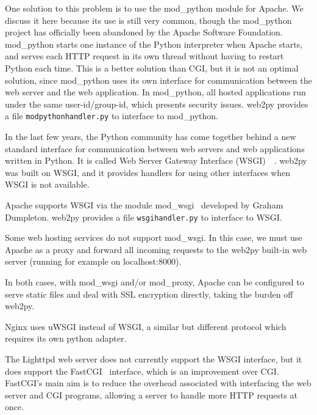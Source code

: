 \documentclass[justified,sixbynine,notoc]{tufte-book}
\def\ft{\small\tt}
\begin{document}
\begin{fullwidth}
One solution to this problem is to use the mod\_python module for Apache. We discuss it here because its use is still very common, though the mod\_python project has officially been abandoned by the Apache Software Foundation. mod\_python starts one instance of the Python interpreter when Apache starts, and serves each HTTP request in its own thread without having to restart Python each time. This is a better solution than CGI, but it is not an optimal solution, since mod\_python uses its own interface for communication between the web server and the web application. In mod\_python, all hosted applications run under the same user-id/group-id, which presents security issues.
\noindent web2py provides a file {\ft modpythonhandler.py} to interface to mod\_python.

In the last few years, the Python community has come together behind a new standard interface for communication between web servers and web applications written in Python. It is called Web Server Gateway Interface (WSGI)~\cite{wsgi-w}~\cite{wsgi-o}. web2py was built on WSGI, and it provides handlers for using other interfaces when WSGI is not available.

Apache supports WSGI via the module mod\_wsgi~\cite{modwsgi}  developed by Graham Dumpleton.
\noindent web2py provides a file {\ft wsgihandler.py} to interface to WSGI.

Some web hosting services do not support mod\_wsgi. In this case, we must use Apache as a proxy and forward all incoming requests to the web2py built-in web server (running for example on localhost:8000).

In both cases, with mod\_wsgi and/or mod\_proxy, Apache can be configured to serve static files and deal with SSL encryption directly, taking the burden off web2py.

Nginx uses uWSGI instead of WSGI, a similar but different protocol which requires its own python adapter.

The Lighttpd web server does not currently support the WSGI interface, but it does support the FastCGI~\cite{fastcgi}  interface, which is an improvement over CGI. FastCGI's main aim is to reduce the overhead associated with interfacing the web server and CGI programs, allowing a server to handle more HTTP requests at once.


\end{fullwidth}
\end{document}

